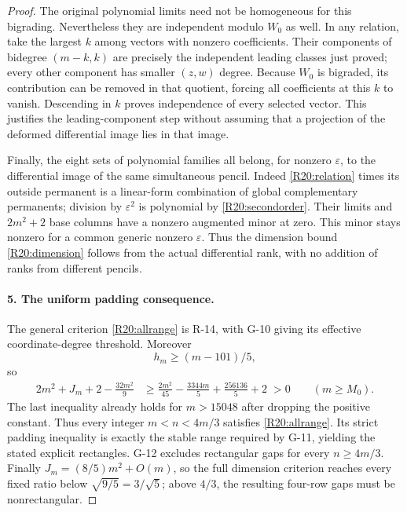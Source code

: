 \begin{proof}
The original polynomial limits need not be homogeneous for this
bigrading. Nevertheless they are independent modulo $W_0$ as well.
In any relation, take the largest $k$ among vectors with nonzero
coefficients. Their components of bidegree $(m-k,k)$ are precisely
the independent leading classes just proved; every other component
has smaller $(z,w)$ degree. Because $W_0$ is bigraded, its contribution
can be removed in that quotient, forcing all coefficients at this
$k$ to vanish. Descending in $k$ proves independence of every
selected vector. This justifies the leading-component step without
assuming that a projection of the deformed differential image lies
in that image.

Finally, the eight sets of polynomial families all belong, for
nonzero $\varepsilon$, to the differential image of the same
simultaneous pencil. Indeed \eqref{R20:relation} times its outside
permanent is a linear-form combination of global complementary
permanents; division by $\varepsilon^2$ is polynomial by
\eqref{R20:secondorder}. Their limits and $2m^2+2$ base columns
have a nonzero augmented minor at zero. This minor stays nonzero
for a common generic nonzero $\varepsilon$. Thus the dimension
bound \eqref{R20:dimension} follows from the actual differential
rank, with no addition of ranks from different pencils.

\paragraph{5. The uniform padding consequence.}
The general criterion \eqref{R20:allrange} is R-14, with G-10
giving its effective coordinate-degree threshold. Moreover
\[
 h_m\geq(m-101)/5,
\]
so
\begin{align*}
 2m^2+J_m+2-\frac{32m^2}{9}
 &\geq \frac{2m^2}{45}-\frac{3344m}{5}
                  +\frac{256136}{5}+2\;>0
 \qquad(m\geq M_0).
\end{align*}
The last inequality already holds for $m>15048$ after dropping
the positive constant. Thus every integer $m<n<4m/3$ satisfies
\eqref{R20:allrange}. Its strict padding inequality is exactly
the stable range required by G-11, yielding the stated explicit
rectangles. G-12 excludes rectangular gaps for every $n\geq4m/3$.
Finally $J_m=(8/5)m^2+O(m)$, so the full dimension criterion reaches
every fixed ratio below $\sqrt{9/5}=3/\sqrt5$; above $4/3$, the
resulting four-row gaps must be nonrectangular.
\end{proof}

